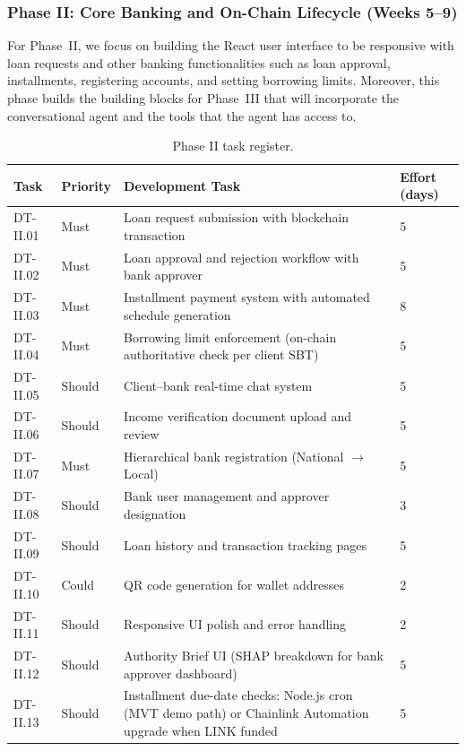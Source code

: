 \subsubsection{Phase II: Core Banking and On-Chain Lifecycle (Weeks 5--9)}

For Phase~II, we focus on building the React user interface to be responsive with loan requests and other banking functionalities such as loan approval, installments, registering accounts, and setting borrowing limits. Moreover, this phase builds the building blocks for Phase~III that will incorporate the conversational agent and the tools that the agent has access to.

\begin{table}[H]
\centering
\caption[Phase II task register]{Phase II task register.}
\label{tab:phaseII-tasks}
\begin{tabular}{p{1.8cm}p{1.8cm}p{7.5cm}p{1.5cm}}
\toprule
\tableheadcolor
\textbf{Task} & \textbf{Priority} & \textbf{Development Task} & \textbf{Effort (days)} \\
\midrule
DT-II.01 & Must & Loan request submission with blockchain transaction & 5 \\
DT-II.02 & Must & Loan approval and rejection workflow with bank approver & 5 \\
DT-II.03 & Must & Installment payment system with automated schedule generation & 8 \\
DT-II.04 & Must & Borrowing limit enforcement (on-chain authoritative check per client SBT) & 5 \\
DT-II.05 & Should & Client--bank real-time chat system & 5 \\
DT-II.06 & Should & Income verification document upload and review & 5 \\
DT-II.07 & Must & Hierarchical bank registration (National $\to$ Local) & 5 \\
DT-II.08 & Should & Bank user management and approver designation & 3 \\
DT-II.09 & Should & Loan history and transaction tracking pages & 5 \\
DT-II.10 & Could & QR code generation for wallet addresses & 2 \\
DT-II.11 & Should & Responsive UI polish and error handling & 2 \\
DT-II.12 & Should & Authority Brief UI (SHAP breakdown for bank approver dashboard) & 5 \\
DT-II.13 & Should & Installment due-date checks: Node.js cron (MVT demo path) or Chainlink Automation upgrade when LINK funded & 5 \\

\end{tabular}
\end{table}
